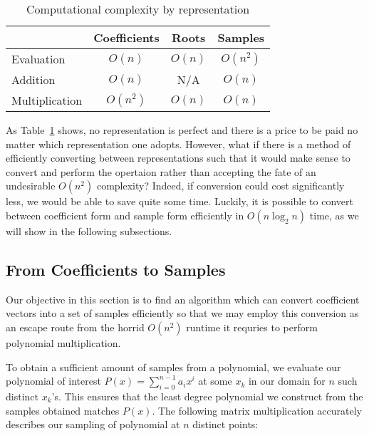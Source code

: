\documentclass[../article.tex]{subfiles}
\begin{document}
\begin{table}[htb]
\begin{center}
\caption{Computational complexity by representation}\label{tab:complexity}
\begin{tabular}{lccc}

&Coefficients&Roots&Samples\\
\hline
Evaluation&$O(n)$&$O(n)$&$O(n^2)$\\
\hline
Addition&$O(n)$&N/A&$O(n)$\\
\hline
Multiplication&$O(n^2)$&$O(n)$&$O(n)$\\

\end{tabular}
\end{center}


\end{table}
\medskip

As Table~\ref{tab:complexity} shows, no representation is perfect and there is a price to be paid no matter which representation one adopts. However, what if there is a method of efficiently converting between representations such that it would make sense to convert and perform the opertaion rather than accepting the fate of an undesirable $O(n^2)$ complexity? Indeed, if conversion could cost significantly less, we would be able to save quite some time. Luckily, it is possible to convert between  coefficient form and sample form efficiently in $O(n\log_2{n})$ time, as we will show in the following subsections.

\subsection{From Coefficients to Samples}
Our objective in this section is to find an algorithm which can convert coefficient vectors into a set of samples efficiently so that we may employ this conversion as an escape route from the horrid $O(n^2)$ runtime it requries to perform polynomial multiplication.

To obtain a sufficient amount of samples from a polynomial, we evaluate our polynomial of interest $P(x) = \sum_{i=0}^{n-1} a_ix^i$ at some $x_k$ in our domain for $n$ such distinct $x_k$'s. This ensures that the least degree polynomial we construct from the samples obtained matches $P(x)$. The following matrix multiplication accurately describes our sampling of polynomial at $n$ distinct points:
\end{document}
